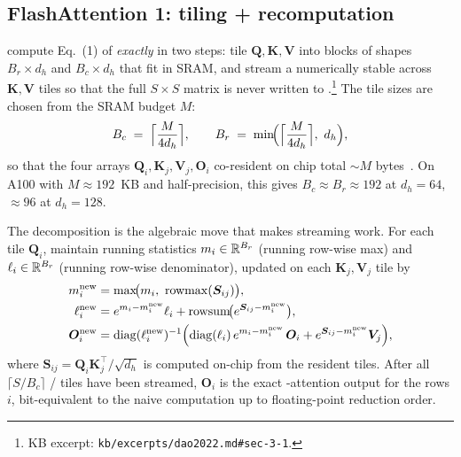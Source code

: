 \subsection{FlashAttention 1: tiling + recomputation}
\label{sec:fa1}

\citet{dao2022} compute Eq.~(1) of \citet{vaswani2017} \emph{exactly}
in two steps: tile $\boldsymbol{Q}, \boldsymbol{K}, \boldsymbol{V}$
into blocks of shapes $B_r \times d_h$ and $B_c \times d_h$ that fit in
SRAM, and stream a numerically stable \emph{} across
$\boldsymbol{K}, \boldsymbol{V}$ tiles so that the full $S \times S$
matrix is never written to .\footnote{KB excerpt:
\texttt{kb/excerpts/dao2022.md\#sec-3-1}.} The tile sizes are chosen
from the SRAM budget $M$:
\begin{equation}
  B_c \;=\; \Bigl\lceil \frac{M}{4 d_h} \Bigr\rceil,
  \qquad
  B_r \;=\; \min\!\Bigl(\Bigl\lceil \frac{M}{4 d_h} \Bigr\rceil,\ d_h\Bigr),
  \label{eq:fa1-tile}
\end{equation}
so that the four arrays
$\boldsymbol{Q}_i, \boldsymbol{K}_j, \boldsymbol{V}_j, \boldsymbol{O}_i$
co-resident on chip total $\sim\!M$
bytes~\citep[Algorithm~1]{dao2022}. On A100 with $M \approx 192$~KB and
half-precision, this gives $B_c \approx B_r \approx 192$ at $d_h = 64$,
$\approx 96$ at $d_h = 128$.

The  decomposition is the algebraic move that makes
streaming work. For each  tile $\boldsymbol{Q}_i$, maintain
running statistics $m_i \in \mathbb{R}^{B_r}$ (running row-wise max) and
$\ell_i \in \mathbb{R}^{B_r}$ (running row-wise  denominator), updated
on each $\boldsymbol{K}_j, \boldsymbol{V}_j$ tile by~\citep[\S
3.1]{dao2022}
\begin{equation}
\begin{aligned}
  m_i^{\text{new}} &= \max\!\bigl(m_i,\ \mathrm{rowmax}(\boldsymbol{S}_{ij})\bigr), \\
  \ell_i^{\text{new}} &= e^{m_i - m_i^{\text{new}}} \ell_i
                       + \mathrm{rowsum}\!\bigl(e^{\boldsymbol{S}_{ij} - m_i^{\text{new}}}\bigr), \\
  \boldsymbol{O}_i^{\text{new}} &= \mathrm{diag}(\ell_i^{\text{new}})^{-1}
        \Bigl(\mathrm{diag}(\ell_i)\, e^{m_i - m_i^{\text{new}}}\, \boldsymbol{O}_i
              + e^{\boldsymbol{S}_{ij} - m_i^{\text{new}}} \boldsymbol{V}_j \Bigr),
\end{aligned}
\label{eq:online-softmax}
\end{equation}
where $\boldsymbol{S}_{ij} = \boldsymbol{Q}_i \boldsymbol{K}_j^\top /
\sqrt{d_h}$ is computed on-chip from the resident tiles. After all
$\lceil S / B_c \rceil$ / tiles have been streamed,
$\boldsymbol{O}_i$ is the exact -attention output for the 
rows $i$, bit-equivalent to the naive computation up to floating-point
reduction order.

